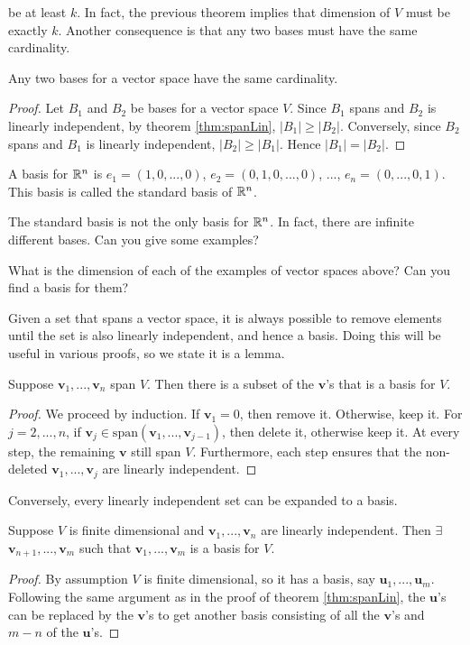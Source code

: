 be at least $k$. In fact, the previous theorem implies that dimension
of $V$ must be exactly $k$. Another consequence is that any two bases must have
the same cardinality. 
\begin{corollary}
  Any two bases for a vector space have the same cardinality.
\end{corollary}
\begin{proof}
  Let $B_1$ and $B_2$ be bases for a vector space $V$. Since $B_1$
  spans and $B_2$ is linearly independent, by theorem
  \ref{thm:spanLin}, $|B_1| \geq |B_2|$. Conversely, since $B_2$ spans
  and $B_1$ is linearly independent, $|B_2| \geq |B_1|$. Hence $|B_1|
  = |B_2|$.
\end{proof}
\begin{example}
  A basis for $\mathbb{R}^n$ is $e_1 = (1, 0, ..., 0 )$, $e_2 = (0, 1, 0, ...,
  0)$, $...$, $e_n = (0, ... , 0 , 1)$. This basis is called the
  standard basis of $\mathbb{R}^n$. 

  The standard basis is not the only basis for $\mathbb{R}^n$. In fact, there
  are infinite different bases. Can you give some examples?
\end{example}
\begin{exercise} 
  What is the dimension of each of the examples of vector spaces
  above? Can you find a basis for them? 
\end{exercise}

Given a set that spans a vector space, it is always possible to remove
elements until the set is also linearly independent, and hence a
basis. Doing this will be useful in various proofs, so we state it is
a lemma.
\begin{lemma}\label{lem:spanToBasis}
  Suppose $\mathbf{v}_1, ..., \mathbf{v}_n$ span $V$. Then there is a
  subset of the $\mathbf{v}$'s that is a basis for $V$.
\end{lemma}
\begin{proof}
  We proceed by induction. If $\mathbf{v}_1 = 0$, then remove
  it. Otherwise, keep it. For $j=2,..., n$, if $\mathbf{v}_j \in
  \text{span}(\mathbf{v}_1, ..., \mathbf{v}_{j-1})$, then delete it,
  otherwise keep it. At every step, the remaining $\mathbf{v}$ still
  span $V$. Furthermore, each step ensures that the non-deleted
  $\mathbf{v}_1, ..., \mathbf{v}_j$ are linearly independent. 
\end{proof}
Conversely, every linearly independent set can be expanded to a
basis. 
\begin{lemma}\label{lem:linToBasis}
  Suppose $V$ is finite dimensional and $\mathbf{v}_1, ...,
  \mathbf{v}_n$ are linearly independent.  Then $\exists$
  $\mathbf{v}_{n+1}, ... , \mathbf{v}_m$ such that $\mathbf{v}_1, ...,
  \mathbf{v}_m$ is a basis for $V$.
\end{lemma}
\begin{proof}
  By assumption $V$ is finite dimensional, so it has a basis, say
  $\mathbf{u}_1, ..., \mathbf{u}_m$. Following the same argument as in
  the proof of theorem \ref{thm:spanLin}, the $\mathbf{u}$'s can be
  replaced by the $\mathbf{v}$'s to get another basis consisting of
  all the $\mathbf{v}$'s and $m-n$ of the $\mathbf{u}$'s.
\end{proof}

